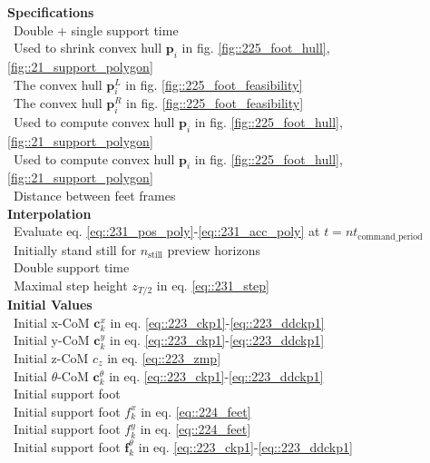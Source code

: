\begin{minipage}[t]{1.\textwidth}
	\begin{minipage}{0.5\textwidth}
		\scriptsize{
			\hfill \textbf{Specifications}\\
			\mbox{}~\hfill Double + single support time\\
			\mbox{}~\hfill Used to shrink convex hull $\bm{p}_i$ in fig.  \ref{fig::225_foot_hull}, \ref{fig::21_support_polygon}\\
			\mbox{}~\hfill The convex hull $\bm{p}^L_i$ in fig. \ref{fig::225_foot_feasibility}\\
			\mbox{}~\hfill The convex hull $\bm{p}^R_i$ in fig. \ref{fig::225_foot_feasibility}\\
			\mbox{}~\hfill Used to compute convex hull $\bm{p}_i$ in fig.  \ref{fig::225_foot_hull}, \ref{fig::21_support_polygon}\\
			\mbox{}~\hfill Used to compute convex hull $\bm{p}_i$ in fig.  \ref{fig::225_foot_hull}, \ref{fig::21_support_polygon}\\
			\mbox{}~\hfill Distance between feet frames\\
			
			\hfill \textbf{Interpolation}\\
			\mbox{}~\hfill Evaluate eq. \ref{eq::231_pos_poly}-\ref{eq::231_acc_poly} at $t=nt_\text{command\_period}$\\
			\mbox{}~\hfill Initially stand still for $n_\text{still}$ preview horizons\\
			\mbox{}~\hfill Double support time\\
			\mbox{}~\hfill Maximal step height $z_{T/2}$ in eq. \ref{eq::231_step}\\
			
			\hfill \textbf{Initial Values}\\
			\mbox{}~\hfill Initial x-CoM $\bm{c}_k^x$ in eq. \ref{eq::223_ckp1}-\ref{eq::223_ddckp1}\\
			\mbox{}~\hfill Initial y-CoM $\bm{c}_k^y$ in eq. \ref{eq::223_ckp1}-\ref{eq::223_ddckp1}\\
			\mbox{}~\hfill Initial z-CoM $c_z$ in eq. \ref{eq::223_zmp}\\
			\mbox{}~\hfill Initial $\theta$-CoM $\bm{c}_k^\theta$ in eq. \ref{eq::223_ckp1}-\ref{eq::223_ddckp1}\\
			\mbox{}~\hfill Initial support foot\\
			\mbox{}~\hfill Initial support foot $f_k^x$ in eq. \ref{eq::224_feet}\\
			\mbox{}~\hfill Initial support foot $f_k^y$ in eq. \ref{eq::224_feet}\\
			\mbox{}~\hfill Initial support foot $\bm{f}_k^\theta$ in eq. \ref{eq::223_ckp1}-\ref{eq::223_ddckp1}\\
			
}
\end{minipage}
\end{minipage}
